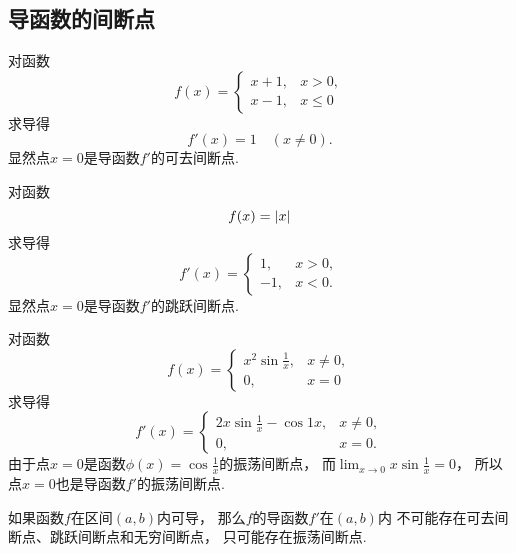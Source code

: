 
\subsection{导函数的间断点}
\begin{example}
对函数\[
	f(x) = \left\{ \begin{array}{cl}
		x+1, & x>0, \\
		x-1, & x\leq0
	\end{array} \right.
\]求导得\[
	f'(x) = 1
	\quad(x\neq0).
\]
显然点\(x=0\)是导函数\(f'\)的可去间断点.
\end{example}

\begin{example}
对函数\[
	f(x) = \abs{x}
\]求导得\[
	f'(x) = \left\{ \begin{array}{cl}
		1, & x>0, \\
		-1, & x<0.
	\end{array} \right.
\]
显然点\(x=0\)是导函数\(f'\)的跳跃间断点.
\end{example}

\begin{example}
对函数\[
	f(x) = \left\{ \begin{array}{cl}
		x^2 \sin\frac1x, & x \neq 0, \\
		0, & x = 0
	\end{array} \right.
\]求导得\[
	f'(x) = \left\{ \begin{array}{cl}
		2x \sin\frac1x - \cos1x, & x \neq 0, \\
		0, & x = 0.
	\end{array} \right.
\]
由于点\(x=0\)是函数\(\phi(x)=\cos\frac1x\)的振荡间断点，
而\(\lim_{x\to0} x \sin\frac1x = 0\)，
所以点\(x=0\)也是导函数\(f'\)的振荡间断点.
\end{example}

\begin{proposition}
如果函数\(f\)在区间\((a,b)\)内可导，
那么\(f\)的导函数\(f'\)在\((a,b)\)内
不可能存在可去间断点、跳跃间断点和无穷间断点，
只可能存在振荡间断点.
\end{proposition}

